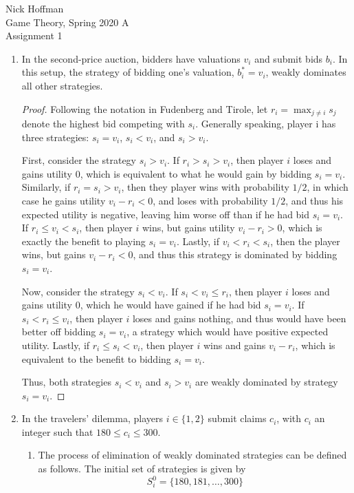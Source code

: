 \documentclass[11pt]{article}
\begin{document}
\begin{flushleft}
	Nick Hoffman \\
	Game Theory, Spring 2020 A \\
	Assignment 1 \\
\end{flushleft}

\begin{enumerate}
	\item In the second-price auction, bidders have valuations $ v_i $ and submit bids $ b_i $. In this setup, the strategy of bidding one's valuation, $ b_i^* = v_i $, weakly dominates all other strategies.
	
	\begin{proof}
		Following the notation in Fudenberg and Tirole, let $ r_i = \max_{j\neq i} s_j $ denote the highest bid competing with $ s_i $. Generally speaking, player i has three strategies: $ s_i = v_i $, $ s_i < v_i $, and $ s_i > v_i $. 
		
		First, consider the strategy $ s_i > v_i $. If $ r_i > s_i > v_i $, then player $ i $ loses and gains utility 0, which is equivalent to what he would gain by bidding $ s_i = v_i $. Similarly, if $ r_i = s_i > v_i $, then they player wins with probability $ 1/2 $, in which case he gains utility $ v_i - r_i < 0 $, and loses with probability $ 1/2 $, and thus his expected utility is negative, leaving him worse off than if he had bid $ s_i = v_i $. If $ r_i \leq v_i < s_i $, then player $ i $ wins, but gains utility $ v_i - r_i > 0 $, which is exactly the benefit to playing $ s_i = v_i $. Lastly, if $ v_i < r_i < s_i $, then the player wins, but gains $ v_i - r_i < 0 $, and thus this strategy is dominated by bidding $ s_i = v_i $.
		
		Now, consider the strategy $ s_i < v_i $. If $ s_i < v_i \leq r_i $, then player $ i $ loses and gains utility 0, which he would have gained if he had bid $ s_i = v_i $. If $ s_i < r_i \leq v_i $, then player $ i $ loses and gains nothing, and thus would have been better off bidding $ s_i = v_i $, a strategy which would have positive expected utility. Lastly, if $ r_i \leq s_i < v_i $, then player $ i $ wins and gains $ v_i - r_i $, which is equivalent to the benefit to bidding $ s_i = v_i $.
		
		Thus, both strategies $ s_i < v_i $ and $ s_i > v_i $ are weakly dominated by strategy $ s_i = v_i $. 
	\end{proof} 

	\item In the travelers' dilemma, players $ i\in \{1,2\} $ submit claims $ c_i $, with $ c_i $ an integer such that $ 180 \leq c_i \leq 300 $. 
	\begin{enumerate}
		\item The process of elimination of weakly dominated strategies can be defined as follows. The initial set of strategies is given by 
		\[S_i^0 = \{180, 181, \dots, 300 \} \]
	\end{enumerate}
\end{enumerate}
\end{document}
